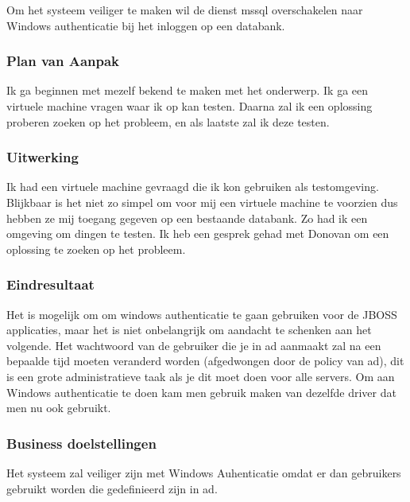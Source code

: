 Om het systeem veiliger te maken wil de dienst \gls{mssql} overschakelen naar Windows authenticatie bij het inloggen op een databank.

\subsubsection{Plan van Aanpak}

Ik ga beginnen met mezelf bekend te maken met het onderwerp. Ik ga een virtuele machine vragen waar ik op kan testen. Daarna zal ik een oplossing proberen zoeken op het probleem, en als laatste zal ik deze testen.

\subsubsection{Uitwerking}

Ik had een virtuele machine gevraagd die ik kon gebruiken als testomgeving. Blijkbaar is het niet zo simpel om voor mij een virtuele machine te voorzien dus hebben ze mij toegang gegeven op een bestaande databank. Zo had ik een omgeving om dingen te testen. Ik heb een gesprek gehad met Donovan om een oplossing te zoeken op het probleem.

\subsubsection{Eindresultaat}

Het is mogelijk om om windows authenticatie te gaan gebruiken voor de JBOSS applicaties, maar het is niet onbelangrijk om aandacht te schenken aan het volgende. Het wachtwoord van de gebruiker die je in \gls{ad} aanmaakt zal na een bepaalde tijd moeten veranderd worden (afgedwongen door de policy van \gls{ad}), dit is een grote administratieve taak als je dit moet doen voor alle servers. Om aan Windows authenticatie te doen kam men gebruik maken van dezelfde driver dat men nu ook gebruikt.

\subsubsection{Business doelstellingen}

Het systeem zal veiliger zijn met Windows Auhenticatie omdat er dan gebruikers gebruikt worden die gedefinieerd zijn in \gls{ad}.